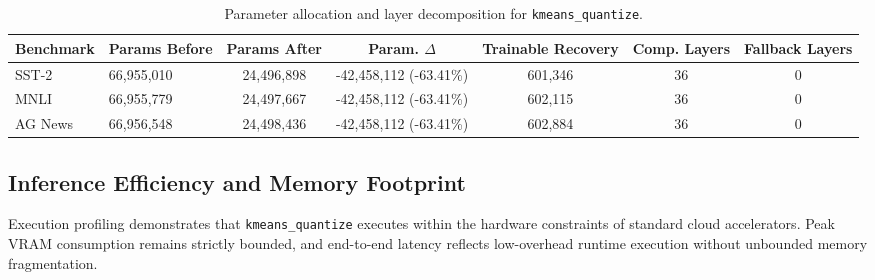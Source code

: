 \begin{table}[t]
\centering
\small
\begin{tabular}{llccccc}
\toprule
\textbf{Benchmark} & \textbf{Params Before} & \textbf{Params After} & \textbf{Param. $\Delta$} & \textbf{Trainable Recovery} & \textbf{Comp. Layers} & \textbf{Fallback Layers} \\
\midrule
SST-2 & 66,955,010 & 24,496,898 & -42,458,112 (-63.41\%) & 601,346 & 36 & 0 \\
MNLI & 66,955,779 & 24,497,667 & -42,458,112 (-63.41\%) & 602,115 & 36 & 0 \\
AG News & 66,956,548 & 24,498,436 & -42,458,112 (-63.41\%) & 602,884 & 36 & 0 \\
\bottomrule
\end{tabular}
\caption{Parameter allocation and layer decomposition for \texttt{kmeans\_quantize}.}
\label{tab:params_kmeans_quantize}
\end{table}

\subsection{Inference Efficiency and Memory Footprint}
Execution profiling demonstrates that \texttt{kmeans\_quantize} executes within the hardware constraints of standard cloud accelerators. Peak VRAM consumption remains strictly bounded, and end-to-end latency reflects low-overhead runtime execution without unbounded memory fragmentation.
